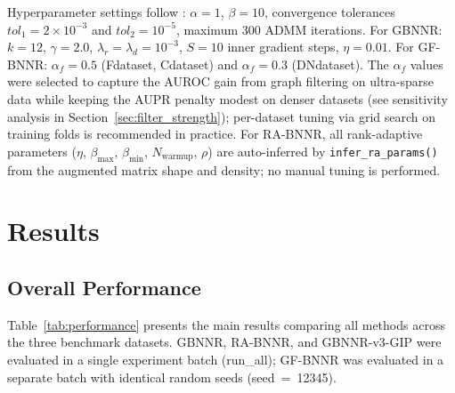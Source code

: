 \documentclass[unnumsec,webpdf,contemporary,large]{oup-authoring-template}
\begin{document}
Hyperparameter settings follow \citet{yang2019}: $\alpha = 1$, $\beta = 10$, convergence tolerances $tol_1 = 2 \times 10^{-3}$ and $tol_2 = 10^{-5}$, maximum 300 ADMM iterations. For GBNNR: $k = 12$, $\gamma = 2.0$, $\lambda_r = \lambda_d = 10^{-3}$, $S = 10$ inner gradient steps, $\eta = 0.01$. For GF-BNNR: $\alpha_f = 0.5$ (Fdataset, Cdataset) and $\alpha_f = 0.3$ (DNdataset). The $\alpha_f$ values were selected to capture the AUROC gain from graph filtering on ultra-sparse data while keeping the AUPR penalty modest on denser datasets (see sensitivity analysis in Section~\ref{sec:filter_strength}); per-dataset tuning via grid search on training folds is recommended in practice. For RA-BNNR, all rank-adaptive parameters ($\eta$, $\beta_{\max}$, $\beta_{\min}$, $N_{\text{warmup}}$, $\rho$) are auto-inferred by \texttt{infer\_ra\_params()} from the augmented matrix shape and density; no manual tuning is performed.

\section{Results}
\label{sec:results}

\subsection{Overall Performance}
\label{sec:overall_performance}

Table~\ref{tab:performance} presents the main results comparing all methods across the three benchmark datasets. GBNNR, RA-BNNR, and GBNNR-v3-GIP were evaluated in a single experiment batch (run\_all); GF-BNNR was evaluated in a separate batch with identical random seeds (seed~=~12345).
\end{document}
